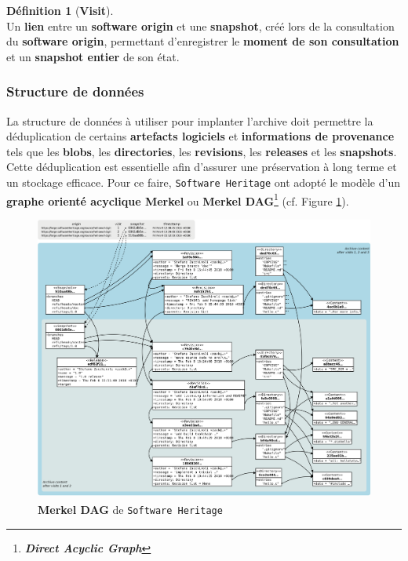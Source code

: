 \documentclass[12pt,a4paper]{report}
\theoremstyle{definition}
\newtheorem*{definition}{Définition}
\begin{document}
\begin{definition}[\textbf{Visit}]\mbox{}\\
Un \textbf{lien} entre un \textbf{software origin} et une \textbf{snapshot}, créé lors de la consultation du \textbf{software origin}, permettant d'enregistrer le \textbf{moment de son consultation} et un \textbf{snapshot entier} de son état.
\end{definition}

\subsubsection{Structure de données}
La structure de données à utiliser pour implanter l'archive doit permettre la déduplication de certains \textbf{artefacts logiciels} et \textbf{informations de provenance} tels que les \textbf{blobs}, les \textbf{directories}, les \textbf{revisions}, les \textbf{releases} et les \textbf{snapshots}. Cette déduplication est essentielle afin d'assurer une préservation à long terme et un stockage efficace. Pour ce faire, \texttt{Software Heritage} ont adopté le modèle d'un \textbf{graphe orienté acyclique Merkel}\textsuperscript{\citep{dicosmoWhyAndHow}} ou \textbf{Merkel DAG}\footnote{\textbf{\textit{Direct Acyclic Graph}}} (cf. Figure \ref{fig:swh_data_structure}).

\begin{figure}[!ht]
	\centering
	\includegraphics[scale=0.15]{images/swh/data_structure.png}
	\caption{\textbf{Merkel DAG} de \texttt{Software Heritage}\textsuperscript{\citep{swhRevisionNode}}}
	\label{fig:swh_data_structure}
\end{figure}
\end{document}
